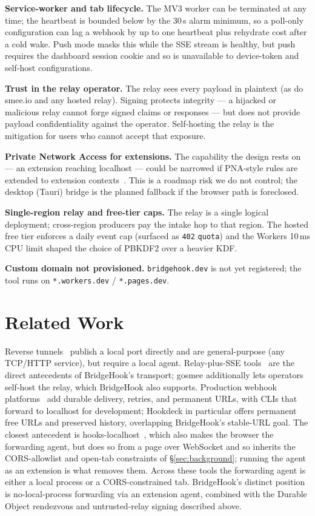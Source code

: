 \documentclass[11pt]{article}
\begin{document}
\textbf{Service-worker and tab lifecycle.} The MV3 worker can be terminated at
any time; the heartbeat is bounded below by the 30\,s alarm minimum, so a
poll-only configuration can lag a webhook by up to one heartbeat plus rehydrate
cost after a cold wake. Push mode masks this while the SSE stream is healthy,
but push requires the dashboard session cookie and so is unavailable to
device-token and self-host configurations.

\textbf{Trust in the relay operator.} The relay sees every payload in
plaintext (as do smee.io and any hosted relay). Signing protects integrity ---
a hijacked or malicious relay cannot forge signed claims or responses --- but
does not provide payload confidentiality against the operator. Self-hosting the
relay is the mitigation for users who cannot accept that exposure.

\textbf{Private Network Access for extensions.} The capability the design rests
on --- an extension reaching localhost --- could be narrowed if PNA-style rules
are extended to extension contexts~\cite{pna,pnapreflight}. This is a roadmap
risk we do not control; the desktop (Tauri) bridge is the planned fallback if
the browser path is foreclosed.

\textbf{Single-region relay and free-tier caps.} The relay is a single logical
deployment; cross-region producers pay the intake hop to that region. The
hosted free tier enforces a daily event cap (surfaced as \texttt{402}
\texttt{quota}) and the Workers 10\,ms CPU limit shaped the choice of PBKDF2
over a heavier KDF.

\textbf{Custom domain not provisioned.} \texttt{bridgehook.dev} is not yet
registered; the tool runs on \texttt{*.workers.dev} / \texttt{*.pages.dev}.

\section{Related Work}
\label{sec:related}

Reverse tunnels~\cite{ngrok,cloudflaretunnel,localtunnel,pinggy} publish a local
port directly and are general-purpose (any TCP/HTTP service), but require a
local agent. Relay-plus-SSE tools~\cite{smeeio,smeeclient,gosmee} are the direct
antecedents of BridgeHook's transport; gosmee additionally lets operators
self-host the relay, which BridgeHook also supports. Production webhook
platforms~\cite{svixcli,hookdeck} add durable delivery, retries, and permanent
URLs, with CLIs that forward to localhost for development; Hookdeck in
particular offers permanent free URLs and preserved history, overlapping
BridgeHook's stable-URL goal. The closest antecedent is
hooks-localhost~\cite{hookslocalhost}, which also makes the browser the
forwarding agent, but does so from a page over WebSocket and so inherits the
CORS-allowlist and open-tab constraints of \S\ref{sec:background}; running the
agent as an extension is what removes them. Across these tools the forwarding
agent is either a local process or a CORS-constrained tab. BridgeHook's distinct
position is no-local-process forwarding via an extension agent, combined with
the Durable Object rendezvous and untrusted-relay signing described above.
\end{document}
